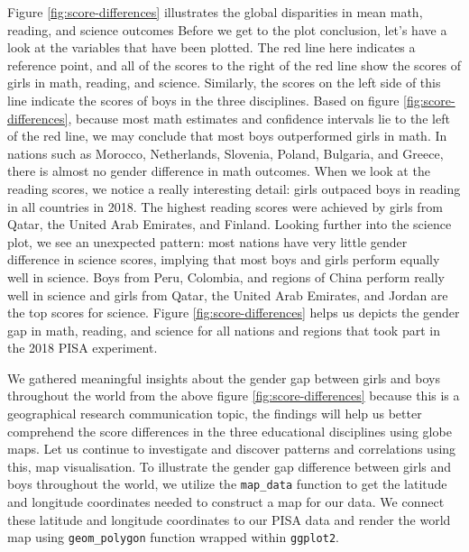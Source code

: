 Figure \ref{fig:score-differences} illustrates the global disparities in
mean math, reading, and science outcomes Before we get to the plot
conclusion, let's have a look at the variables that have been plotted.
The red line here indicates a reference point, and all of the scores to
the right of the red line show the scores of girls in math, reading, and
science. Similarly, the scores on the left side of this line indicate
the scores of boys in the three disciplines. Based on figure
\ref{fig:score-differences}, because most math estimates and confidence
intervals lie to the left of the red line, we may conclude that most
boys outperformed girls in math. In nations such as Morocco,
Netherlands, Slovenia, Poland, Bulgaria, and Greece, there is almost no
gender difference in math outcomes. When we look at the reading scores,
we notice a really interesting detail: girls outpaced boys in reading in
all countries in 2018. The highest reading scores were achieved by girls
from Qatar, the United Arab Emirates, and Finland. Looking further into
the science plot, we see an unexpected pattern: most nations have very
little gender difference in science scores, implying that most boys and
girls perform equally well in science. Boys from Peru, Colombia, and
regions of China perform really well in science and girls from Qatar,
the United Arab Emirates, and Jordan are the top scores for science.
Figure \ref{fig:score-differences} helps us depicts the gender gap in
math, reading, and science for all nations and regions that took part in
the 2018 PISA experiment.

We gathered meaningful insights about the gender gap between girls and
boys throughout the world from the above figure
\ref{fig:score-differences} because this is a geographical research
communication topic, the findings will help us better comprehend the
score differences in the three educational disciplines using globe maps.
Let us continue to investigate and discover patterns and correlations
using this, map visualisation. To illustrate the gender gap difference
between girls and boys throughout the world, we utilize the
\texttt{map\_data} function to get the latitude and longitude
coordinates needed to construct a map for our data. We connect these
latitude and longitude coordinates to our PISA data and render the world
map using \texttt{geom\_polygon} function wrapped within
\texttt{ggplot2}.

